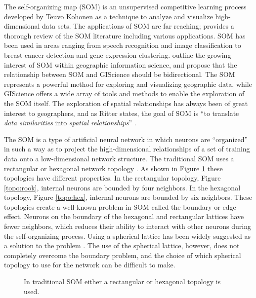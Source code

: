 The self-organizing map (SOM) is an unsupervised competitive learning process
developed by Teuvo Kohonen as a technique to analyze and visualize
high-dimensional data sets.  The applications of SOM are far reaching;
\cite{Kohonen2000} provides a thorough review of the SOM literature including
various applications.  SOM has been used in areas ranging from speech
recognition and image classification to breast cancer detection and gene
expression clustering.  \cite{skupin08} outline the growing interest of SOM
within geographic information science, and propose that the relationship
between SOM and GIScience should be bidirectional.  The SOM represents a
powerful method for exploring and visualizing geographic data, while GIScience
offers a wide array of tools and methods to enable the exploration of the SOM
itself.  The exploration of spatial relationships has always been of great
interest to geographers, and as Ritter states, the goal of SOM is ``to
translate \emph{data similarities} into \emph{spatial relationships}''
\cite[p. 1]{ritter99}.

The SOM is a type of artificial neural network in which neurons are
``organized'' in such a way as to project the high-dimensional relationships
of a set of training data onto a low-dimensional network structure.  The
traditional SOM uses a rectangular or hexagonal network topology
\citep{Kohonen2000}.  As shown in Figure \ref{topos} these topologies have
different properties.  In the rectangular topology, Figure \ref{topo:rook},
internal neurons are bounded by four neighbors.  In the hexagonal topology,
Figure \ref{topo:hex}, internal neurons are bounded by six neighbors. These
topologies create a well-known problem in SOM called the boundary or edge
effect.  Neurons on the boundary of the hexagonal and rectangular lattices
have fewer neighbors, which reduces their ability to interact with other
neurons during the self-organizing process.  Using a spherical lattice has
been widely suggested as a solution to the problem \citep{ritter99,
boudjemai2003, sangole03, Nishio:2006fk, wu2006}. The use of the spherical
lattice, however, does not completely overcome the boundary problem, and the
choice of which spherical topology to use for the network can be difficult to
make.

\begin{figure}
\centering
\caption{In traditional SOM either a rectangular or hexagonal topology is used.}
\label{topos}
\end{figure}

